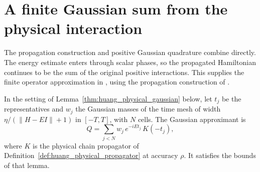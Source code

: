 \section{A finite Gaussian sum from the physical interaction}
\label{sec:huang_physical_gaussian}

The propagation construction and positive Gaussian quadrature combine directly.
The energy estimate enters through scalar phases, so the propagated Hamiltonian
continues to be the sum of the original positive interactions. This supplies the
finite operator approximation in \cite[Section 5.4, Lemma 19 and equations
    (19)--(22)]{Huang2015GroundState}, using the propagation construction of
\cite[Figure 2 and equations (12)--(13)]{Osborne2006Dynamics}.

\begin{definition}
    \label{def:huang_physical_gaussian}
    \leanok
    In the setting of Lemma~\ref{thm:huang_physical_gaussian} below, let
    $t_j$ be the representatives and $w_j$ the Gaussian masses of the time
    mesh of width $\eta/(\|H-EI\|+1)$ in $[-T,T]$, with $N$ cells. The
    Gaussian approximant is
    \[
        Q=\sum_{j<N}w_j\,e^{-iEt_j}\,K(-t_j),
    \]
    where $K$ is the physical chain propagator of
    Definition~\ref{def:huang_physical_propagator} at accuracy $\rho$. It
    satisfies the bounds of that lemma.
\end{definition}

